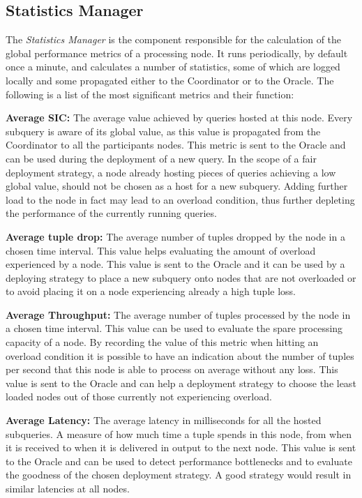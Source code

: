 \subsection{Statistics Manager}

The \emph{Statistics Manager} is the component responsible for the calculation of the global performance
metrics of a processing node. It runs periodically, by default once a minute, and calculates a number of
statistics, some of which are logged locally and some propagated either to the Coordinator or to the
Oracle. The following is a list of the most significant metrics and their function:

\textbf{Average SIC:} The average \sic value achieved by queries hosted at this node. Every subquery is
aware of its global \sic value, as this value is propagated from the Coordinator to all the
participants nodes. This metric is sent to the Oracle and can be used during the deployment of
a new query. In the scope of a fair deployment strategy, a node already hosting pieces of queries
achieving a low global \sic value, should not be chosen as a host for a new subquery. Adding further load to the node
in fact may lead to an overload condition, thus further depleting the performance of the currently
running queries. 

\textbf{Average tuple drop:} The average number of tuples dropped by the node in a chosen time interval.
This value helps evaluating the amount of overload experienced by a node. This value is sent to the
Oracle and it can be used by a deploying strategy to place a new subquery onto nodes that are not
overloaded or to avoid placing it on a node experiencing already a high tuple loss. 

\textbf{Average Throughput:} The average number of tuples processed by the node in a chosen time
interval. This value can be used to evaluate the spare processing capacity of a node. By recording the
value of this metric when hitting an overload condition it is possible to have an indication about the
number of tuples per second that this node is able to process on average without any loss. This value is
sent to the Oracle and can help a deployment strategy to choose the least loaded nodes out of those
currently not experiencing overload.

\textbf{Average Latency:} The average latency in milliseconds for all the hosted subqueries. A measure of
how much time a tuple spends in this node, from when it is received to when it is delivered in output to
the next node. This value is sent to the Oracle and can be used to detect performance bottlenecks and to
evaluate the goodness of the chosen deployment strategy. A good strategy would result in similar
latencies at all nodes.

